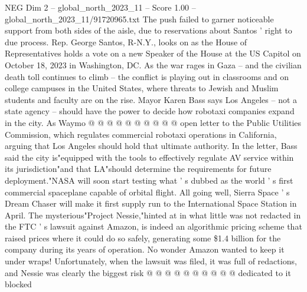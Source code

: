 \begin{textsample}{NEG Dim 2 – global\_north\_2023\_11 – Score 1.00 – global\_north\_2023\_11/91720965.txt}
The push failed to garner noticeable support from both sides of the aisle, due to reservations about Santos ' right to due process.
Rep.
George Santos, R-N.Y., looks on as the House of Representatives holds a vote on a new Speaker of the House at the US Capitol on October 18, 2023 in Washington, DC.
As the war rages in Gaza -- and the civilian death toll continues to climb -- the conflict is playing out in classrooms and on college campuses in the United States, where threats to Jewish and Muslim students and faculty are on the rise.
Mayor Karen Bass says Los Angeles -- not a state agency -- should have the power to decide how robotaxi companies expand in the city.
As Waymo @ @ @ @ @ @ @ @ @ @ open letter to the Public Utilities Commission, which regulates commercial robotaxi operations in California, arguing that Los Angeles should hold that ultimate authority.
In the letter, Bass said the city is"equipped with the tools to effectively regulate AV service within its jurisdiction"and that LA"should determine the requirements for future deployment."NASA will soon start testing what ' s dubbed as the world ' s first commercial spaceplane capable of orbital flight.
All going well, Sierra Space ' s Dream Chaser will make it first supply run to the International Space Station in April.
The mysterious"Project Nessie,"hinted at in what little was not redacted in the FTC ' s lawsuit against Amazon, is indeed an algorithmic pricing scheme that raised prices where it could do so safely, generating some \$1.4 billion for the company during its years of operation.
No wonder Amazon wanted to keep it under wraps!
Unfortunately, when the lawsuit was filed, it was full of redactions, and Nessie was clearly the biggest risk @ @ @ @ @ @ @ @ @ @ dedicated to it blocked

\end{textsample}
